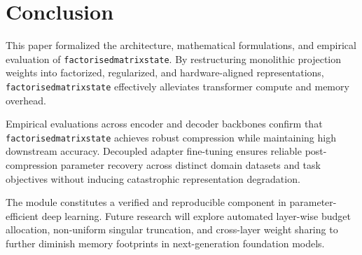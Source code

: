 \section{Conclusion}
This paper formalized the architecture, mathematical formulations, and empirical evaluation of \texttt{factorisedmatrixstate}. By restructuring monolithic projection weights into factorized, regularized, and hardware-aligned representations, \texttt{factorisedmatrixstate} effectively alleviates transformer compute and memory overhead.

Empirical evaluations across encoder and decoder backbones confirm that \texttt{factorisedmatrixstate} achieves robust compression while maintaining high downstream accuracy. Decoupled adapter fine-tuning ensures reliable post-compression parameter recovery across distinct domain datasets and task objectives without inducing catastrophic representation degradation.

The module constitutes a verified and reproducible component in parameter-efficient deep learning. Future research will explore automated layer-wise budget allocation, non-uniform singular truncation, and cross-layer weight sharing to further diminish memory footprints in next-generation foundation models.
